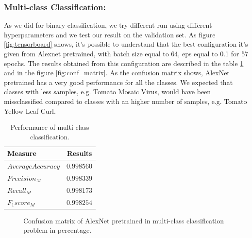 \subsubsection{Multi-class Classification:}
As we did for binary classification, we try different run using different hyperparameters and we test our result on the validation set. As figure \ref{fig:tensorboard} shows, it's possible to understand that the best configuration it's given from Alexnet pretrained, with batch size equal to 64, eps equal to 0.1 for 57 epochs. The results obtained from this configuration are described in the table \ref{table:multiclass} and in the figure \ref{fig:conf_matrix}. As the confusion matrix shows, AlexNet pretrained has a very good performance for all the classes. We expected that classes with less samples, e.g. Tomato Mosaic Virus, would have been missclassified compared to classes with an higher number of samples, e.g. Tomato Yellow Leaf Curl.
\begin{table}[H]
	\begin{center}
		\begin{tabular}{|l|c|}
			\hline
			\textbf{Measure} & \textbf{Results} \\ 
			\hline
			$Average Accuracy$ & $0.998560$ \\
			$Precision_M$ & $0.998339$ \\
			$Recall_M$ & $0.998173$ \\
			$F_1 score_M$ & $0.998254$ \\
			\hline
		\end{tabular}
	\end{center}
	\caption{Performance of multi-class classification.}
	\label{table:multiclass}
\end{table}
\begin{figure}[t]
	\begin{center}
	\end{center}
	\caption{Confusion matrix of AlexNet pretrained in multi-class classification problem in percentage. }
	\label{fig:conf_matrix}
	\label{fig:long}
	\label{fig:onecol}
\end{figure}
